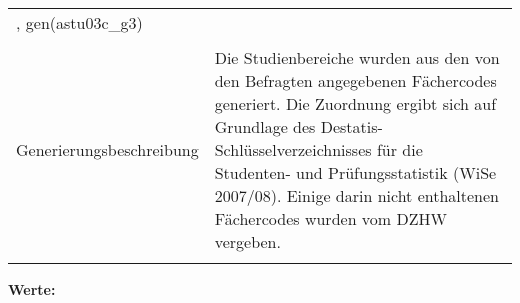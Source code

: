 \begin{tabular}{lL{11.3cm}}
, gen(astu03c\_g3) \\
				 \\
					Generierungsbeschreibung & Die Studienbereiche wurden aus den von den Befragten angegebenen Fächercodes generiert. Die Zuordnung ergibt sich auf Grundlage des Destatis-Schlüsselverzeichnisses für die Studenten- und Prüfungsstatistik (WiSe 2007/08). Einige darin nicht enthaltenen Fächercodes wurden vom DZHW vergeben. 
				 \\	
			 \\
		\end{tabular}






			\vspace*{1 cm}
			\noindent\textbf{Werte:}\\
